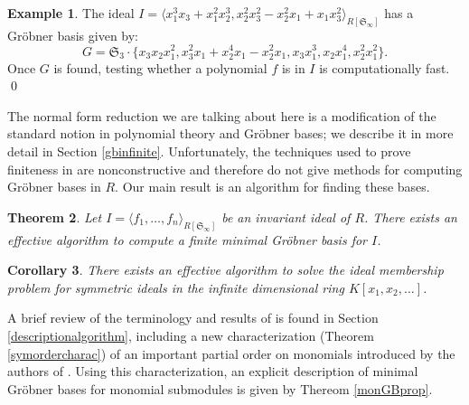 \documentclass{amsart}
\newtheorem{theorem}{Theorem}[section]
\newtheorem{corollary}[theorem]{Corollary}
\theoremstyle{definition}
\newtheorem{example}[theorem]{Example}
\theoremstyle{remark}
\numberwithin{equation}{section}
\newcommand{\<}{\langle}
\renewcommand{\>}{\rangle}
\begin{document}
\begin{example}
The ideal $I = \<x_1^3 x_3 + x_1^2 x_2^3, 
x_2^2 x_3^2 - x_2^2 x_1 + x_1 x_3^2\>_{R[{\mathfrak S}_{\infty}]}$ has a 
Gr\"obner basis given by:
\[ G = {\mathfrak S}_{3} \cdot \{x_3 x_2 x_1^2, x_3^2 x_1 + x_2^4 x_1 - x_2^2 x_1, 
x_3 x_1^3, x_2 x_1^4, x_2^2 x_1^2\}.\]
Once $G$ is found, testing whether a polynomial $f$ is in $I$ is computationally fast.
\qed
\end{example}

The normal form reduction we are talking about here is a modification of the
standard notion in polynomial theory and Gr\"obner bases;  
we describe it in more detail in Section \ref{gbinfinite}.
Unfortunately, the techniques used to
prove finiteness in \cite{AH} are nonconstructive and therefore do not
give methods for computing Gr\"obner bases in $R$.
Our main result is an algorithm for finding these bases.

\begin{theorem}
Let $I = \<f_1, \ldots, f_n\>_{R[{\mathfrak S}_{\infty}]}$ be an invariant ideal of $R$.
There exists an effective algorithm to compute a finite minimal Gr\"obner basis for $I$.
\end{theorem}

\begin{corollary}
There exists an effective algorithm to solve the ideal membership problem
for symmetric ideals in the infinite dimensional ring $K[x_1,x_2,\ldots]$.
\end{corollary}



A brief review of 
the terminology and results of \cite{AH} is found in Section \ref{descriptionalgorithm},
including a new characterization (Theorem \ref{symordercharac}) of an important partial order on
monomials introduced by the authors of \cite{AH}.
Using this characterization, an explicit description of minimal 
Gr\"obner bases for monomial submodules is given by Thereom \ref{monGBprop}.
\end{document}
